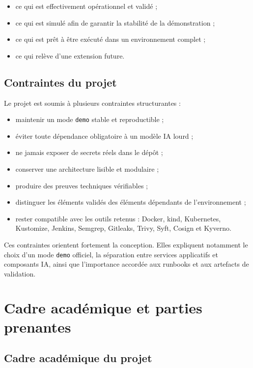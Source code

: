 \begin{itemize}
    \item ce qui est effectivement opérationnel et validé ;
    \item ce qui est simulé afin de garantir la stabilité de la démonstration ;
    \item ce qui est prêt à être exécuté dans un environnement complet ;
    \item ce qui relève d'une extension future.
\end{itemize}

\subsection{Contraintes du projet}

Le projet est soumis à plusieurs contraintes structurantes :

\begin{itemize}
    \item maintenir un mode \texttt{demo} stable et reproductible ;
    \item éviter toute dépendance obligatoire à un modèle IA lourd ;
    \item ne jamais exposer de secrets réels dans le dépôt ;
    \item conserver une architecture lisible et modulaire ;
    \item produire des preuves techniques vérifiables ;
    \item distinguer les éléments validés des éléments dépendants de l'environnement ;
    \item rester compatible avec les outils retenus : Docker, kind, Kubernetes, Kustomize, Jenkins, Semgrep, Gitleaks, Trivy, Syft, Cosign et Kyverno.
\end{itemize}

Ces contraintes orientent fortement la conception. Elles expliquent notamment le choix d'un mode \texttt{demo} officiel, la séparation entre services applicatifs et composants IA, ainsi que l'importance accordée aux runbooks et aux artefacts de validation.

\section{Cadre académique et parties prenantes}

\subsection{Cadre académique du projet}

